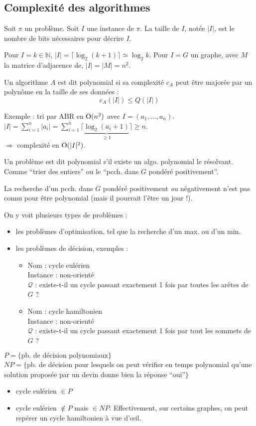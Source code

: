 \documentclass[a4paper, 8pt]{article}
\begin{document}
\begin{multicols*}{3}
\section*{Complexité des algorithmes}

Soit $\pi$ un problème. Soit $I$ une instance de $\pi$. La taille de $I$, notée $|I|$, est le nombre de bits nécessaires pour décrire $I$.

Pour $I = k\in\mathbb{N}$, $|I| = \lceil\log_2(k+1)\rceil \simeq \log_2 k$. Pour $I = G$ un graphe, avec $M$ la matrice d'adjacence de, $|I| = |M| = n^2$. 

Un algorithme $A$ est dit polynomial si sa complexité $c_A$ peut être majorée par un polynôme en la taille de ses données :
\[ c_A(|I|) \leqslant Q(|I|) \]

Exemple : tri par ABR en $\text{O}(n^2)$ avec $I = (a_1,\ldots, a_n)$. $|I| = \sum_{i=1}^n{|a_i|} =\sum_{i=1}^n{\lceil\underbrace{\log_2(a_i+1)}_{\geqslant 1}\rceil} \geqslant n$.\\
$\Rightarrow$ complexité en $\text{O}(|I|^2)$.
\medskip

Un problème est dit polynomial s'il existe un algo. polynomial le résolvant. Comme \enquote{trier des entiers} ou le  \enquote{pcch. dans $G$ pondéré positivement}.

La recherche d'un pcch. dans $G$ pondéré positivement \emph{ou} négativement n'est pas connu pour être polynomial (mais il pourrait l'être un jour !).

On y voit plusieurs types de problèmes :
\begin{itemize}
	\item les problèmes d'optimisation, tel que la recherche d'un max. ou d'un min.
	\item les problèmes de décision, exemples :
	\begin{itemize}
		\item Nom : cycle eulérien\\
		Instance : \GXA non-orienté\\
		$\mathcal{Q}$ : existe-t-il un cycle passant exactement 1 fois par toutes les arêtes de $G$ ?
		\item Nom : cycle hamiltonien\\
		Instance : \GXA non-orienté\\
		$\mathcal{Q}$ : existe-t-il un cycle passant exactement 1 fois par tout les sommets de $G$ ?
	\end{itemize}
\end{itemize}

$P = \{\text{pb. de décision polynomiaux}\}$\\
$N\!P = \{$pb. de décision pour lesquels on peut vérifier en temps polynomial qu'une solution proposée par un devin donne bien la réponse \enquote{oui}$\}$
\begin{itemize}
	\item cycle eulérien $\in P$
	\item cycle eulérien $\not\in P$ mais $\in N\!P$. Effectivement, sur certains graphes, on peut repérer un cycle hamiltonien à vue d'œil.
\end{itemize}


\end{multicols*}
\end{document}
